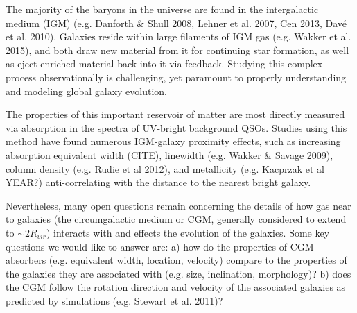 \documentclass[12pt]{article}
\begin{document}
%
%
\justification          %


\indent \indent The majority of the baryons in the universe are found in the intergalactic medium (IGM) (e.g. Danforth $\&$ Shull 2008, Lehner et al. 2007, Cen 2013, Dav\'e et al. 2010). Galaxies reside within large filaments of IGM gas (e.g. Wakker et al. 2015), and both draw new material from it for continuing star formation, as well as eject enriched material back into it via feedback. Studying this complex process observationally is challenging, yet paramount to properly understanding and modeling global galaxy evolution.

The properties of this important reservoir of matter are most directly measured via absorption in the spectra of UV-bright background QSOs. Studies using this method have found numerous IGM-galaxy proximity effects, such as increasing absorption equivalent width (CITE), linewidth (e.g. Wakker $\&$ Savage 2009), column density (e.g. Rudie et al 2012), and metallicity (e.g. Kacprzak et al YEAR?) anti-correlating with the distance to the nearest bright galaxy. 

Nevertheless, many open questions remain concerning the details of how gas near to galaxies (the circumgalactic medium or CGM, generally considered to extend to $\sim 2R_{vir}$) interacts with and effects the evolution of the galaxies. Some key questions we would like to answer are:
a) how do the properties of CGM absorbers (e.g. equivalent width, location, velocity) compare to the properties of the galaxies they are associated with (e.g. size, inclination, morphology)?
b) does the CGM follow the rotation direction and velocity of the associated galaxies as predicted by simulations (e.g. Stewart et al. 2011)?
\end{document}
